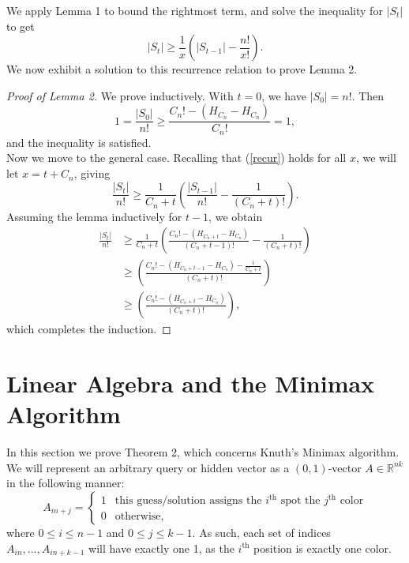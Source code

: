 \documentclass[12pt, a4paper]{article}
\newcommand{\R}{\mathbb{R}}           %
\begin{document}
		We apply Lemma 1 to bound the rightmost term, and solve the inequality for $|S_t|$ to get 
		\begin{equation}\label{recur}
			|S_t| \ge \frac{1}{x}\left(|S_{t-1}|-\frac{n!}{x!}\right).
		\end{equation}
		We now exhibit a solution to this recurrence relation to prove Lemma 2.
		
		\begin{proof}[Proof of Lemma 2] We prove inductively. With $t=0$, we have $|S_0| = n!$. Then
			\begin{equation*}
			1 =\frac{|S_0|}{n!}\ge \frac{C_{n}! - (H_{C_{n}}-H_{C_{n}})}{C_{n}!} = 1,
			\end{equation*}
			and the inequality is satisfied. \\
			Now we move to the general case.
			Recalling that (\ref{recur}) holds for all $x$, we will
		let $x=t+C_{n}$, giving
			\begin{equation*}
			\frac{|S_t|}{n!}
			 \ge \frac{1}{C_{n}+t}\left(\frac{|S_{t-1}|}{n!}
			-\frac{1}{(C_{n}+t)!}\right).
			\end{equation*}
		Assuming the lemma inductively for $t-1$, we obtain
			\begin{align*}
			\frac{|S_t|}{n!}
			& \ge \frac{1}{C_{n}+t}\left(\frac{C_{n}!-(H_{C_{n}+t} - H_{C_{n}})}
			{(C_{n}+t-1)!} - \frac{1}{(C_{n}+t)!}\right)\\
			& \ge \left(\frac{C_{n}! - (H_{C_{n}+t-1} - H_{C_{n}}) - \frac{1}{C_{n}+t}}
			{(C_{n}+t)!}\right)\\
			& \ge \left(\frac{C_{n}! - (H_{C_{n}+t} - H_{C_{n}})}{(C_{n}+t)!}\right),
			\end{align*}
			which completes the induction.
		\end{proof}
\section{Linear Algebra and the Minimax Algorithm}
In this section we prove Theorem 2, which concerns Knuth's Minimax algorithm. 
We will represent an arbitrary query or hidden vector as a $(0,1)$-vector $A \in \R^{nk}$ in the following manner: 
$$
A_{in+j} = \begin{cases}
1 & \text{this guess/solution assigns the $i^\text{th}$ spot the $j^\text{th}$ color} \\
0 & \text{otherwise},
\end{cases}
$$
where $0 \leq i \leq n-1$ and $0 \leq j \leq k-1$. As such, each set of indices $A_{in},\dots,A_{in+k-1}$ will have exactly one 1, as the $i^\text{th}$ position is exactly one color.
\end{document}
